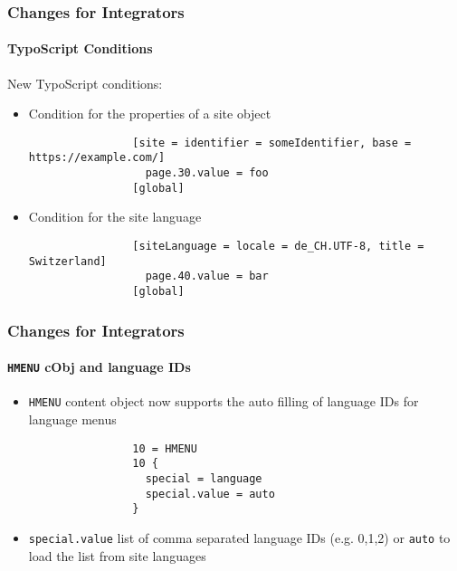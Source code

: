 \begin{frame}[fragile]
	\frametitle{Changes for Integrators}
	\framesubtitle{TypoScript Conditions}

	New TypoScript conditions:

	\begin{itemize}
		\item Condition for the properties of a site object

			\begin{lstlisting}
				[site = identifier = someIdentifier, base = https://example.com/]
				  page.30.value = foo
				[global]
			\end{lstlisting}

		\item Condition for the site language

			\begin{lstlisting}
				[siteLanguage = locale = de_CH.UTF-8, title = Switzerland]
				  page.40.value = bar
				[global]
			\end{lstlisting}

	\end{itemize}

\end{frame}


\begin{frame}[fragile]
	\frametitle{Changes for Integrators}
	\framesubtitle{\texttt{HMENU} cObj and language IDs}


	\begin{itemize}
		\item \texttt{HMENU} content object now supports the auto filling of
			language IDs for language menus

			\begin{lstlisting}
				10 = HMENU
				10 {
				  special = language
				  special.value = auto
				}
  			\end{lstlisting}

		\item \texttt{special.value} list of comma separated language IDs
			(e.g. 0,1,2) or \texttt{auto} to load the list from site languages

	\end{itemize}

\end{frame}


